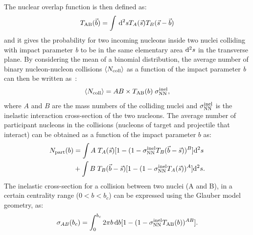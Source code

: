The nuclear overlap function is then defined as:
\begin{equation}
T_{\rm AB} (\vec{b}) = \int \,{\rm d}^2s T_A(\vec s)T_B(\vec s - \vec b)
\end{equation}
and it gives the probability for two incoming nucleons inside two nuclei colliding 
with impact parameter \textit{b} to be in the same elementary area ${\rm d}^2s$ in the transverse plane.
By considering the mean of a binomial distribution, the average number of 
binary nucleon-nucleon collisions $\langle N_{\rm coll}\rangle$ as a function 
of the impact parameter \textit{b} can then be written as~\cite{Miller:2007ri}:
\begin{equation}
\langle N_{\rm coll}\rangle = AB \times T_{\rm AB}(b)\; \sigma^{\rm inel}_{\rm NN},
\end{equation}
where $A$ and $B$ are the mass numbers of the colliding nuclei and $\sigma^{\rm inel}_{\rm NN}$
is the inelastic interaction cross-section of the two nucleons.
The average number of participant nucleons in the collisions (nucleons of target 
and projectile that interact) can be obtained as a function of the impact parameter $b$ as:
\begin{equation}
\begin{aligned}
N_{\rm part} (b) &= \int A \; T_A(\vec{s}) [1- (1-  \sigma^{\rm inel}_{\rm NN} T_B(\vec{b}-\vec{s}))^B]{\rm d}^2s \\
& + \int B \; T_B(\vec{b}-\vec{s}) [1- (1-  \sigma^{\rm inel}_{\rm NN} T_A(\vec{s}))^A]{\rm d}^2s.
\end{aligned}
\end{equation}
The inelastic cross-section for a collision between two nuclei (A and B), 
in a certain centrality range ($0 < b < b_c$) 
can be expressed using the Glauber model geometry, as:
\begin{equation}
\label{eq:sigmaABGlauber}
\sigma_{AB}(b_c) = \int_0^{b_c} 2\pi b\,{\rm d}b [1 - (1 - \sigma^{\rm inel}_{\rm NN}T_{\rm AB}(b))^{AB}]. %
\end{equation}
